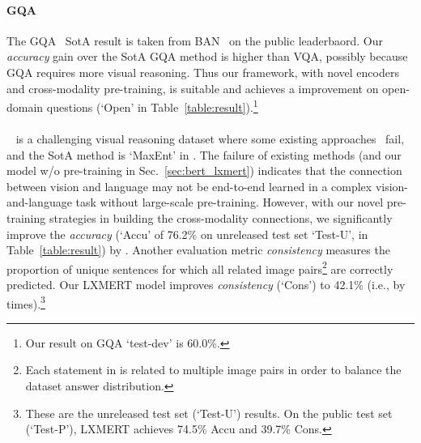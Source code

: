 \documentclass[11pt,a4paper]{article}
\newcommand\NLVR{}
\begin{document}
\paragraph{GQA}
The GQA~\cite{hudson2019gqa} SotA result is taken from BAN~\cite{kim2018bilinear} on the public leaderbaord.
Our  \emph{accuracy} gain over the SotA GQA method is higher than VQA, possibly because GQA requires more visual reasoning. 
Thus our framework, with novel encoders and cross-modality pre-training, is suitable and achieves a  improvement on open-domain questions (`Open' in Table~\ref{table:result}).\footnote{Our result on GQA `test-dev' is 60.0\%.}
\paragraph{\NLVR}
~\cite{suhr2018corpus} is a challenging visual reasoning dataset where some existing approaches~\cite{hu2017learning, perez2018film} fail, and the SotA method is `MaxEnt' in .
The failure of existing methods (and our model w/o pre-training in Sec.~\ref{sec:bert_lxmert}) indicates that the connection between vision and language may not be end-to-end learned in a complex vision-and-language task without large-scale pre-training.
However,  with our novel pre-training strategies in building the cross-modality connections, we significantly improve the \emph{accuracy} (`Accu' of 76.2\% on unreleased test set `Test-U', in Table~\ref{table:result}) by .
Another evaluation metric \emph{consistency} measures the proportion of unique sentences for which all related image pairs\footnote{Each statement in  is related to multiple image pairs in order to balance the dataset answer distribution.} are correctly predicted.
Our LXMERT model improves \emph{consistency} (`Cons') to 42.1\% (i.e., by  times).\footnote{These are the unreleased test set (`Test-U') results. On the public test set (`Test-P'), LXMERT achieves 74.5\% Accu and 39.7\% Cons.}
 
\end{document}
